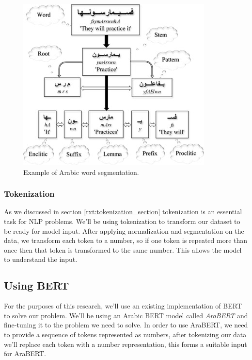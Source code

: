 \documentclass[12pt]{diazessay}
\begin{document}
            \begin{figure}[h]
                \includegraphics[scale=1]{Figures/arabic_segmentation.png}
                \caption{Example of Arabic word segmentation.\cite{arabic_segmentation}}
                \label{fig:arabic_segmentation}
            \end{figure}
            
            
            \subsubsection{Tokenization}
            As we discussed in section \ref{txt:tokenization_section} tokenization is an essential task for NLP problems. We'll be using tokenization to transform our dataset to be ready for model input. After applying normalization and segmentation on the data, we transform each token to a number, so if one token is repeated more than once then that token is transformed to the same number. This allows the model to understand the input.
            
        \subsection{Using BERT}
        For the purposes of this research, we'll use an existing implementation of BERT to solve our problem. We'll be using an Arabic BERT model called \emph{AraBERT} and fine-tuning it to the problem we need to solve.\cite{wissam}
        In order to use AraBERT, we need to provide a sequence of tokens represented as numbers, after tokenizing our data we'll replace each token with a number representation, this forms a suitable input for AraBERT.
            
\end{document}
